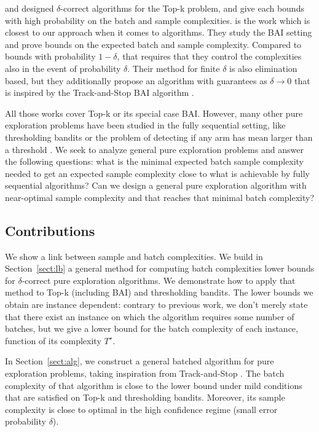 \citet{jinEfficientPureExploration2019} and \citet{karpovCollaborativeTopDistribution2020} designed $\delta$-correct algorithms for the Top-k problem, and give each bounds with high probability on the batch and sample complexities.
\citep{jinOptimalBatchedBest2023} is the work which is closest to our approach when it comes to algorithms. They study the BAI setting and prove bounds on the expected batch and sample complexity. Compared to bounds with probability $1 - \delta$, that requires that they control the complexities also in the event of probability $\delta$. Their method for finite $\delta$ is also elimination based, but they additionally propose an algorithm with guarantees as $\delta \to 0$ that is inspired by the Track-and-Stop BAI algorithm \citep{garivierOptimalBestArm2016}.

All those works cover Top-k or its special case BAI. However, many other pure exploration problems have been studied in the fully sequential setting, like thresholding bandits \citep{locatelliOptimalAlgorithmThresholding2016} or the problem of detecting if any arm has mean larger than a threshold \citep{kaufmann2018sequential}.
We seek to analyze general pure exploration problems and answer the following questions: what is the minimal expected batch sample complexity needed to get an expected sample complexity close to what is achievable by fully sequential algorithms? Can we design a general pure exploration algorithm with near-optimal sample complexity and that reaches that minimal batch complexity?

\subsection{Contributions}

We show a link between sample and batch complexities.
We build in Section~\ref{sect:lb} a general method for computing batch complexities lower bounds for $\delta$-correct pure exploration algorithms.
We demonstrate how to apply that method to Top-k (including BAI) and thresholding bandits.
The lower bounds we obtain are instance dependent: contrary to previous work, we don't merely state that there exist an instance on which the algorithm requires some number of batches, but we give a lower bound for the batch complexity of each instance, function of its complexity $T^\star$.


In Section~\ref{sect:alg}, we construct a general batched algorithm for pure exploration problems, taking inspiration from Track-and-Stop \citep{garivierOptimalBestArm2016}.
The batch complexity of that algorithm is close to the lower bound under mild conditions that are satisfied on Top-k and thresholding bandits. Moreover, its sample complexity is close to optimal in the high confidence regime (small error probability $\delta$).